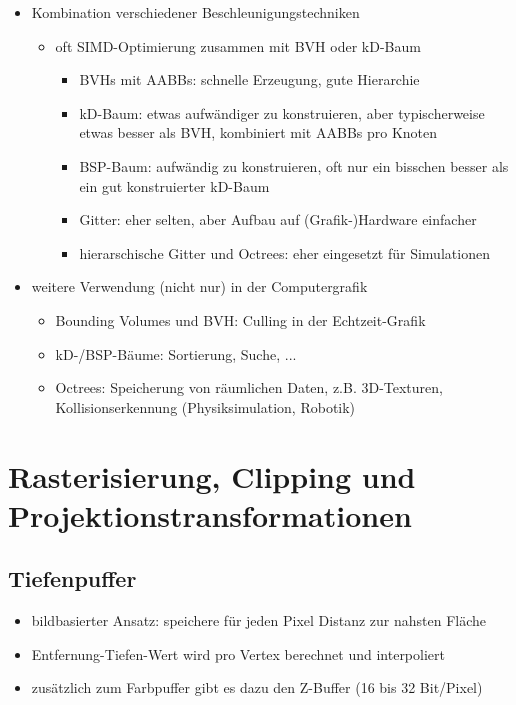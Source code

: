 \documentclass[paper=a4, fontsize=11pt]{scrartcl} %
\numberwithin{equation}{section} %
\numberwithin{figure}{section} %
\numberwithin{table}{section} %
\begin{document}
\begin{itemize}
\item Kombination verschiedener Beschleunigungstechniken
\begin{itemize}
\item oft SIMD-Optimierung zusammen mit BVH oder kD-Baum
\begin{itemize}
\item BVHs mit AABBs: schnelle Erzeugung, gute Hierarchie
\item kD-Baum: etwas aufwändiger zu konstruieren, aber typischerweise etwas besser als BVH, kombiniert mit AABBs pro Knoten
\item BSP-Baum: aufwändig zu konstruieren, oft nur ein bisschen besser als ein gut konstruierter kD-Baum
\item Gitter: eher selten, aber Aufbau auf (Grafik-)Hardware einfacher
\item hierarschische Gitter und Octrees: eher eingesetzt für Simulationen
\end{itemize}
\end{itemize}
\item weitere Verwendung (nicht nur) in der Computergrafik
\begin{itemize}
\item Bounding Volumes und BVH: Culling in der Echtzeit-Grafik
\item kD-/BSP-Bäume: Sortierung, Suche, ...
\item Octrees: Speicherung von räumlichen Daten, z.B. 3D-Texturen, Kollisionserkennung (Physiksimulation, Robotik)
\end{itemize}
\end{itemize}

\section{Rasterisierung, Clipping und Projektionstransformationen}

\subsection{Tiefenpuffer}

\begin{itemize}
\item bildbasierter Ansatz: speichere für jeden Pixel Distanz zur nahsten Fläche
\item Entfernung-Tiefen-Wert wird pro Vertex berechnet und interpoliert
\item zusätzlich zum Farbpuffer gibt es dazu den Z-Buffer (16 bis 32 Bit/Pixel)
\end{itemize}
\end{document}
